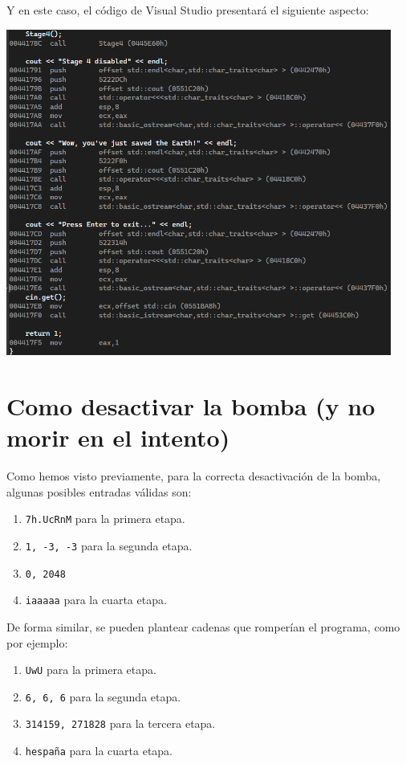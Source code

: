 \documentclass[11pt,a4paper]{article}
\begin{document}
\noindent Y en este caso, el código de Visual Studio presentará el siguiente aspecto:
\begin{center}
\includegraphics[width=0.95\textwidth]{s4-2.png}
\end{center}
\vspace{3ex}

\section{Como desactivar la bomba (y no morir en el intento)}
Como hemos visto previamente, para la correcta desactivación de la bomba, algunas posibles entradas válidas son:
\begin{enumerate}
  \item \texttt{7h.UcRnM} para la primera etapa.
  \item \texttt{1, -3, -3} para la segunda etapa.
  \item \texttt{0, 2048}
  \item \texttt{iaaaaa} para la cuarta etapa.
\end{enumerate}
\vspace{2ex}

\noindent De forma similar, se pueden plantear cadenas que romperían el programa, como por ejemplo:
\begin{enumerate}
  \item \texttt{UwU} para la primera etapa.
  \item \texttt{6, 6, 6} para la segunda etapa.
  \item \texttt{314159, 271828} para la tercera etapa.
  \item \texttt{hespaña} para la cuarta etapa.
\end{enumerate}
\vspace{2ex}
\end{document}
